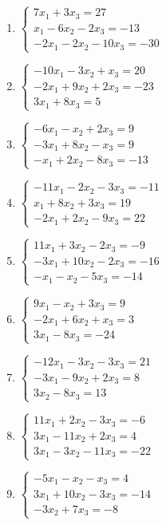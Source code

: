 \bigskip
\begin{enumerate}[label=\arabic*., leftmargin=*]
\item $\begin{cases}7x_1+3x_3=27\\x_1-6x_2-2x_3=-13\\-2x_1-2x_2-10x_3=-30\end{cases}$
\item $\begin{cases}-10x_1-3x_2+x_3=20\\-2x_1+9x_2+2x_3=-23\\3x_1+8x_3=5\end{cases}$
\item $\begin{cases}-6x_1-x_2+2x_3=9\\-3x_1+8x_2-x_3=9\\-x_1+2x_2-8x_3=-13\end{cases}$
\item $\begin{cases}-11x_1-2x_2-3x_3=-11\\x_1+8x_2+3x_3=19\\-2x_1+2x_2-9x_3=22\end{cases}$
\item $\begin{cases}11x_1+3x_2-2x_3=-9\\-3x_1+10x_2-2x_3=-16\\-x_1-x_2-5x_3=-14\end{cases}$
\item $\begin{cases}9x_1-x_2+3x_3=9\\-2x_1+6x_2+x_3=3\\3x_1-8x_3=-24\end{cases}$
\item $\begin{cases}-12x_1-3x_2-3x_3=21\\-3x_1-9x_2+2x_3=8\\3x_2-8x_3=13\end{cases}$
\item $\begin{cases}11x_1+2x_2-3x_3=-6\\3x_1-11x_2+2x_3=4\\3x_1-3x_2-11x_3=-22\end{cases}$
\item $\begin{cases}-5x_1-x_2-x_3=4\\3x_1+10x_2-3x_3=-14\\-3x_2+7x_3=-8\end{cases}$

\end{enumerate}
